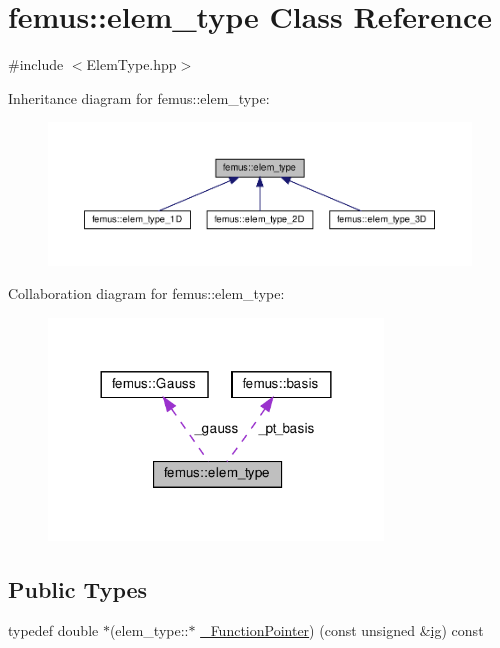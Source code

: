 \hypertarget{classfemus_1_1elem__type}{}\section{femus\+:\+:elem\+\_\+type Class Reference}
\label{classfemus_1_1elem__type}


{\ttfamily \#include $<$Elem\+Type.\+hpp$>$}



Inheritance diagram for femus\+:\+:elem\+\_\+type\+:
\nopagebreak
\begin{figure}[H]
\begin{center}
\leavevmode
\includegraphics[width=350pt]{classfemus_1_1elem__type__inherit__graph}
\end{center}
\end{figure}


Collaboration diagram for femus\+:\+:elem\+\_\+type\+:
\nopagebreak
\begin{figure}[H]
\begin{center}
\leavevmode
\includegraphics[width=252pt]{classfemus_1_1elem__type__coll__graph}
\end{center}
\end{figure}
\subsection*{Public Types}
\begin{DoxyCompactItemize}
\item 
typedef double $\ast$(elem\+\_\+type\+::$\ast$ \mbox{\hyperlink{classfemus_1_1elem__type_ac6d3f8df5299550225a2f77c2aa15dde}{\+\_\+\+Function\+Pointer}}) (const unsigned \&\mbox{\hyperlink{namespacefemus_a6df31099f676311de214a312d7043941}{ig}}) const
\end{DoxyCompactItemize}
